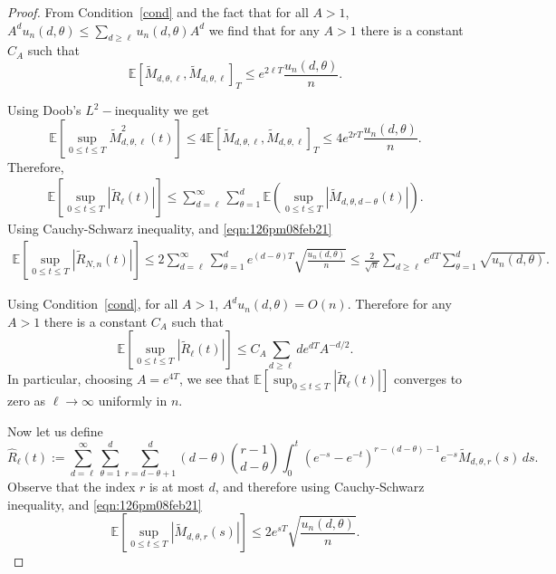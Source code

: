 \documentclass[11pt]{article}
\begin{document}
\begin{proof}
From Condition~\ref{cond} and the fact that for all $A>1$,
$A^d u_n(d,\theta) \leq \sum_{d \geq \ell}u_n(d,\theta) A^d$ we find that for any $A>1$ there is a constant $C_A$ such that 
\begin{equation*}%
   \mathbb{E} \left[\widetilde{M}_{d,\theta,\ell},\widetilde{M}_{d,\theta,\ell}\right]_T \leq e^{2\ell T} \frac{u_n(d,\theta)}{n}.
\end{equation*}


Using Doob's $L^2-$inequality we get
 \begin{equation}\label{eqn:126pm08feb21}
 \mathbb{E} \left[ \sup_{0\leq t\leq T} \widetilde{M}_{d,\theta,\ell}^2(t)\right] \leq 4 \mathbb{E}\left[\widetilde{M}_{d,\theta,\ell},\widetilde{M}_{d,\theta,\ell}\right]_T \leq 4e^{2rT} \frac{u_n(d,\theta)}{n}.
  \end{equation}
    Therefore,
    \begin{align*}
        \mathbb{E} \left[ \sup_{0\leq t\leq T} \left| \widetilde{R}_{\ell}(t)\right|\right] \leq \sum_{d= \ell}^\infty\sum_{\theta=1}^{d} \mathbb{E} \left( \sup_{0\leq t\leq T} \left|\widetilde{M}_{d,\theta,d-\theta}(t)\right|\right).
    \end{align*}
    Using Cauchy-Schwarz inequality, and \eqref{eqn:126pm08feb21}
     \begin{align*}
        \mathbb{E} \left[ \sup_{0\leq t\leq T} \left| \widetilde{R}_{N,n}(t)\right|\right] \leq 2\sum_{d=\ell}^{\infty}\sum_{\theta=1}^{d} e^{(d-\theta)T} \sqrt{\frac{u_n(d,\theta)}{n}} \leq \frac{2}{\sqrt{n}} \sum_{d\geq \ell}e^{dT}\sum_{\theta=1}^{d}  \sqrt{u_n(d,\theta)}. %
    \end{align*}


         Using Condition~\ref{cond}, for all $A>1$,
$A^d u_n(d,\theta) =O(n) $. Therefore for any $A>1$ there is a constant $C_A$ such that
\begin{equation*}
    \mathbb{E} \left[ \sup_{0\leq t\leq T} \left| \widetilde{R}_{\ell}(t)\right|\right] \leq C_A \sum_{d\geq \ell} de^{dT}A^{-d/2}.
\end{equation*}
In particular, choosing $A=e^{4T}$, we see that $\mathbb{E} \left[ \sup_{0\leq t\leq T} \left| \widetilde{R}_{\ell}(t)\right|\right]$ converges to zero as $\ell\rightarrow \infty$ uniformly in $n$.


    Now let us define 
    $$
    \widehat{R}_{\ell}(t):= \sum_{d= \ell}^{\infty}\sum_{\theta=1}^{d}\sum_{r=d-\theta+1}^{d}(d-\theta){r-1\choose d-\theta }\int_{0}^t(e^{-s}-e^{-t})^{r-(d-\theta)-1}e^{-s} \widetilde{M}_{d, \theta, r}(s) \, ds.
    $$ 
    Observe that the index $r$ is at most $d$, and therefore using Cauchy-Schwarz inequality, and \eqref{eqn:126pm08feb21}
\begin{equation}\label{eqn:424pm08feb21}
\mathbb{E}\left[ \sup_{0\leq t\leq T}\left|\widetilde{M}_{d, \theta, r}(s)\right|\right]\leq 2e^{sT}\sqrt{\frac{u_n(d,\theta)}{n}}. 
\end{equation}


\end{proof}
\end{document}
